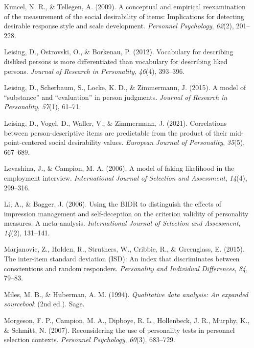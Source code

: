 \documentclass[
  ,jou]{apa6}
\newlength{\cslhangindent}
\newenvironment{CSLReferences}[2] %
 {\begin{list}{}{%
  \setlength{\itemindent}{0pt}
  \setlength{\leftmargin}{0pt}
  \setlength{\parsep}{0pt}
  \ifodd #1
   \setlength{\leftmargin}{\cslhangindent}
   \setlength{\itemindent}{-1\cslhangindent}
  \fi
  \setlength{\itemsep}{#2\baselineskip}}}
 {\end{list}}
\begin{document}
\begin{CSLReferences}{1}{0}
Kuncel, N. R., \& Tellegen, A. (2009). A conceptual and empirical reexamination of the measurement of the social desirability of items: Implications for detecting desirable response style and scale development. \emph{Personnel Psychology}, \emph{62}(2), 201--228.

Leising, D., Ostrovski, O., \& Borkenau, P. (2012). Vocabulary for describing disliked persons is more differentiated than vocabulary for describing liked persons. \emph{Journal of Research in Personality}, \emph{46}(4), 393--396.

Leising, D., Scherbaum, S., Locke, K. D., \& Zimmermann, J. (2015). A model of {``substance''} and {``evaluation''} in person judgments. \emph{Journal of Research in Personality}, \emph{57}(1), 61--71.

Leising, D., Vogel, D., Waller, V., \& Zimmermann, J. (2021). Correlations between person-descriptive items are predictable from the product of their mid-point-centered social desirability values. \emph{European Journal of Personality}, \emph{35}(5), 667--689.

Levashina, J., \& Campion, M. A. (2006). A model of faking likelihood in the employment interview. \emph{International Journal of Selection and Assessment}, \emph{14}(4), 299--316.

Li, A., \& Bagger, J. (2006). Using the {BIDR} to distinguish the effects of impression management and self-deception on the criterion validity of personality measures: A meta-analysis. \emph{International Journal of Selection and Assessment}, \emph{14}(2), 131--141.

Marjanovic, Z., Holden, R., Struthers, W., Cribbie, R., \& Greenglass, E. (2015). The inter-item standard deviation ({ISD}): An index that discriminates between conscientious and random responders. \emph{Personality and Individual Differences}, \emph{84}, 79--83.

Miles, M. B., \& Huberman, A. M. (1994). \emph{Qualitative data analysis: An expanded sourcebook} (2nd ed.). Sage.

Morgeson, F. P., Campion, M. A., Dipboye, R. L., Hollenbeck, J. R., Murphy, K., \& Schmitt, N. (2007). Reconsidering the use of personality tests in personnel selection contexts. \emph{Personnel Psychology}, \emph{60}(3), 683--729.


\end{CSLReferences}
\end{document}
